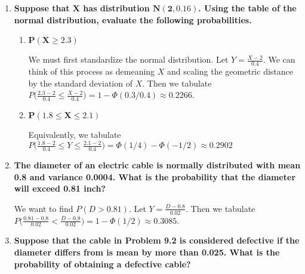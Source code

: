 \documentclass[10pt, oneside]{article}   	%
\theoremstyle{definition}
\begin{document}
\begin{enumerate}[label=9.\arabic*]
\itemsep0em 
\item  \begin{tcolorbox}[
  colback=Cerulean!5!white,
  colframe=Cerulean!75!black]
\textbf{Suppose that $\bm{X}$ has distribution $\bm{N(2, 0.16)}$. Using the table of the normal distribution, evaluate the following probabilities.}
\end{tcolorbox}

	\begin{enumerate}
	\item  \begin{tcolorbox}[
	  colback=Cerulean!5!white,
	  colframe=Cerulean!75!black]
	\textbf{$\bm{P(X \geq 2.3)}$}
	\end{tcolorbox}
	
	We must first standardize the normal distribution. Let $Y = \frac{X - 2}{0.4}$. We can think of this process as demeaning $X$ and scaling the geometric distance by the standard deviation of $X$. Then we tabulate $P\Big( \frac{2.3-2}{0.4} \leq \frac{X-2}{0.4} \Big) = 1 - \Phi(0.3/0.4) \approx \boxed{0.2266}$.  
	
	\item  \begin{tcolorbox}[
	  colback=Cerulean!5!white,
	  colframe=Cerulean!75!black]
	\textbf{$\bm{P(1.8 \leq X \leq 2.1)}$}
	\end{tcolorbox}
	
	Equivalently, we tabulate $P \Big( \frac{1.8-2}{0.4} \leq Y \leq \frac{2.1-2}{0.4} \Big) = \Phi(1/4) - \Phi(-1/2) \approx \boxed{0.2902}$
	
	\end{enumerate}

\item  \begin{tcolorbox}[
  colback=Cerulean!5!white,
  colframe=Cerulean!75!black]
\textbf{The diameter of an electric cable is normally distributed with mean 0.8 and variance 0.0004. What is the probability that the diameter will exceed 0.81 inch?}
\end{tcolorbox}

We want to find $P(D > 0.81)$. Let $Y = \frac{D - 0.8}{0.02}$. Then we tabulate $P\Big( \frac{0.81 - 0.8}{0.02} < \frac{D - 0.8}{0.02} \Big) = 1 - \Phi(1/2) \approx \boxed{0.3085}$.

\item  \begin{tcolorbox}[
  colback=Cerulean!5!white,
  colframe=Cerulean!75!black]
\textbf{Suppose that the cable in Problem 9.2 is considered defective if the diameter differs from is mean by more than 0.025. What is the probability of obtaining a defective cable?}
\end{tcolorbox}


\end{enumerate}
\end{document}
